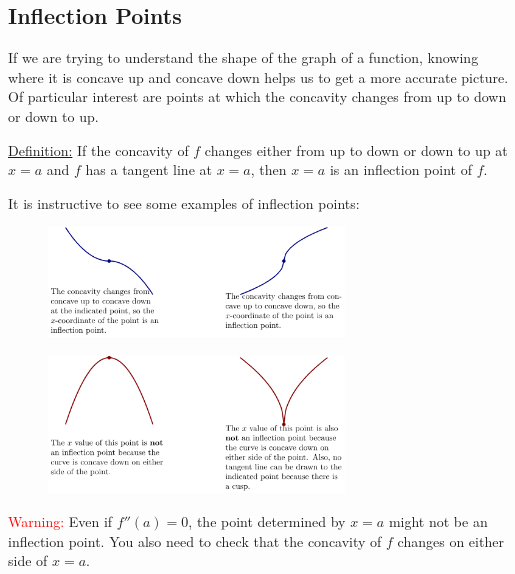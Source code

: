 \documentclass{article}
\begin{document}
\newpage 
\subsection{Inflection Points}
If we are trying to understand the shape of the graph of a function, knowing where it is concave up and concave down helps us to get a more accurate picture. Of particular interest are points at which the concavity changes from up to down or down to up.

\begin{tcolorbox}[sharp corners=uphill]
\underline{Definition:} If the concavity of $f$ changes either from up to down or down to up at $x=a$ and $f$ has a tangent line at $x=a$, then $x=a$ is an inflection point of $f$.
\end{tcolorbox}

It is instructive to see some examples of inflection points:

\begin{figure}[ht]
    \centering
    \includegraphics[width=0.7\textwidth]{imgs/digInConcavityAnd2ndDerivTest-figure4.png}
\end{figure}

\begin{figure}[ht]
    \centering
    \includegraphics[width=0.7\textwidth]{imgs/digInConcavityAnd2ndDerivTest-figure5.png}
\end{figure}

\textcolor{red}{Warning:} Even if $f''(a)=0$, the point determined by $x=a$ might not be an inflection point. You also need to check that the concavity of $f$ changes on either side of $x=a$.
\newpage 
\end{document}
